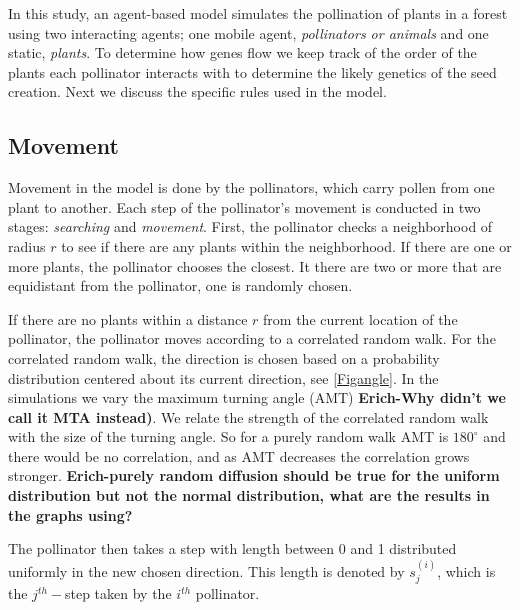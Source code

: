 In this study, an agent-based model simulates the pollination of plants in a forest using two interacting agents; one mobile agent, \emph{pollinators or animals} and one static, \emph{plants}.  To determine how genes flow we keep track of the order of the plants each pollinator interacts with to determine the likely genetics of the seed creation.  Next we discuss the specific rules used in the model.

\subsection{Movement}

Movement in the model is done by the pollinators, which carry pollen from one plant to another.
Each step of the pollinator's movement is conducted in two stages: \emph{searching} and \emph{movement}.
First, the pollinator checks a neighborhood of radius $r$ to see if there are any plants within the neighborhood.
If there are one or more plants, the pollinator chooses the closest.  It there are two or more that are
equidistant from the pollinator, one is randomly chosen.

If there are no plants within a distance $r$ from the current location of the pollinator, the pollinator
moves according to a correlated random walk.  For the correlated random walk, the direction is chosen
based on a probability distribution centered about
its current direction, see \autoref{Figangle}.  In the simulations we vary the maximum turning angle (AMT) {\bf Erich-Why didn't we call it MTA instead)}.  We relate the strength of the correlated random walk with the size of the turning angle.  So for a purely random walk AMT is $180^{\circ}$ and there would be no correlation, and as AMT decreases the correlation grows stronger.  {\bf Erich-purely random diffusion should be true for the uniform distribution but not the normal distribution, what are the results in the graphs using?}

The pollinator then takes a step with
length between 0 and 1 distributed uniformly in the new chosen direction.  This length is denoted by
$s_j^{(i)}$, which is the $j^{th}-$step taken by the $i^{th}$ pollinator.\\
\vspace{.8in}

